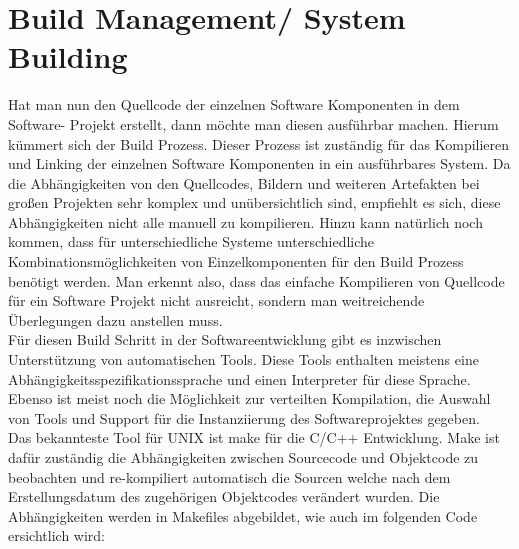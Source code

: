 \chapter{Build Management/ System Building}

Hat man nun den Quellcode der einzelnen Software Komponenten in dem Software- Projekt erstellt, dann möchte man diesen ausführbar machen. Hierum kümmert sich der Build Prozess. Dieser Prozess ist zuständig für das Kompilieren und Linking der einzelnen Software Komponenten in ein ausführbares System. Da die Abhängigkeiten von den Quellcodes, Bildern und weiteren Artefakten bei großen Projekten sehr komplex und unübersichtlich sind, empfiehlt es sich, diese Abhängigkeiten nicht alle manuell zu kompilieren. Hinzu kann natürlich noch kommen, dass für unterschiedliche Systeme unterschiedliche Kombinationsmöglichkeiten von Einzelkomponenten für den Build Prozess benötigt werden. Man erkennt also, dass das einfache Kompilieren von Quellcode für ein Software Projekt nicht ausreicht, sondern man weitreichende Überlegungen dazu anstellen muss.
\\
Für diesen Build Schritt in der Softwareentwicklung gibt es inzwischen Unterstützung von automatischen Tools. 
Diese Tools enthalten meistens eine Abhängigkeitsspezifikationssprache und einen Interpreter für  diese Sprache. Ebenso ist meist noch die Möglichkeit zur verteilten Kompilation, die Auswahl von Tools und Support für die Instanziierung des Softwareprojektes gegeben. 
\\
Das bekannteste Tool für UNIX ist make für die C/C++ Entwicklung. Make ist dafür zuständig die Abhängigkeiten zwischen Sourcecode und Objektcode zu beobachten und re-kompiliert automatisch die Sourcen welche nach dem Erstellungsdatum des zugehörigen Objektcodes verändert wurden. Die Abhängigkeiten werden in Makefiles abgebildet, wie auch im folgenden Code ersichtlich wird:



